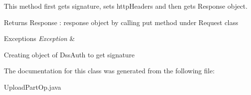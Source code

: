 This method first gets signature, sets http\+Headers and then gets Response object. 

\begin{DoxyReturn}{Returns}
Response \+: response object by calling put method under Request class 
\end{DoxyReturn}

\begin{DoxyExceptions}{Exceptions}
{\em Exception} & \\
\hline
\end{DoxyExceptions}
Creating object of Dss\+Auth to get signature 

The documentation for this class was generated from the following file\+:\begin{DoxyCompactItemize}
\item 
Upload\+Part\+Op.\+java\end{DoxyCompactItemize}

